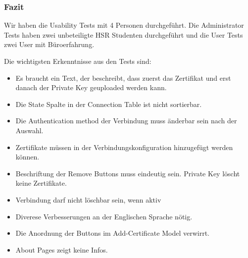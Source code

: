 \subsubsection{Fazit}
Wir haben die Usability Tests mit 4 Personen durchgeführt. Die Administrator Tests haben zwei unbeteiligte HSR Studenten durchgeführt und die User Tests zwei User mit Büroerfahrung.

Die wichtigsten Erkenntnisse aus den Tests sind:
\begin{itemize}
    \item Es braucht ein Text, der beschreibt, dass zuerst das Zertifikat und erst danach der Private Key geuploaded werden kann.
    \item Die State Spalte in der Connection Table ist nicht sortierbar.
    \item Die Authentication method der Verbindung muss änderbar sein nach der Auswahl.
    \item Zertifikate müssen in der Verbindungskonfiguration hinzugefügt werden können.
    \item Beschriftung der Remove Buttons muss eindeutig sein. Private Key löscht keine Zertifikate.
    \item Verbindung darf nicht löschbar sein, wenn aktiv
    \item Diverese Verbesserungen an der Englischen Sprache nötig.
    \item Die Anordnung der Buttons im Add-Certificate Model verwirrt.
    \item About Pages zeigt keine Infos.
\end{itemize}
